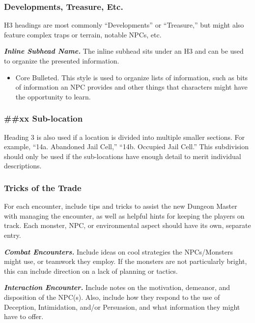 \subsubsection{Developments, Treasure,
Etc.}\label{developments-treasure-etc.}

H3 headings are most commonly ``Developments'' or ``Treasure,'' but
might also feature complex traps or terrain, notable NPCs, etc.

\emph{\textbf{Inline Subhead Name.}} The inline subhead sits under an H3
and can be used to organize the presented information.

\begin{itemize}
\item
  Core Bulleted. This style is used to organize lists of information,
  such as bits of information an NPC provides and other things that
  characters might have the opportunity to learn.
\end{itemize}

\subsubsection{\#\#xx Sub-location}\label{xx-sub-location}

Heading 3 is also used if a location is divided into multiple smaller
sections. For example, ``14a. Abandoned Jail Cell,'' ``14b. Occupied
Jail Cell.'' This subdivision should only be used if the sub-locations
have enough detail to merit individual descriptions.

\subsubsection{Tricks of the Trade}\label{tricks-of-the-trade}

For each encounter, include tips and tricks to assist the new Dungeon
Master with managing the encounter, as well as helpful hints for keeping
the players on track. Each monster, NPC, or environmental aspect should
have its own, separate entry.

\emph{\textbf{Combat Encounters.}} Include ideas on cool strategies the
NPCs/Monsters might use, or teamwork they employ. If the monsters are
not particularly bright, this can include direction on a lack of
planning or tactics.

\emph{\textbf{Interaction Encounter.}} Include notes on the motivation,
demeanor, and disposition of the NPC(s). Also, include how they respond
to the use of Deception, Intimidation, and/or Persuasion, and what
information they might have to offer.

